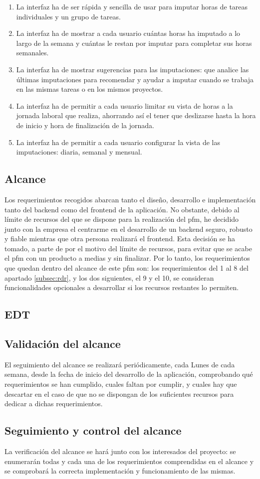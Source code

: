 \begin{enumerate}
 \item La interfaz ha de ser rápida y sencilla de usar para imputar horas de
 tareas individuales y un grupo de tareas.

 \item La interfaz ha de mostrar a cada usuario cuántas horas ha imputado
 a lo largo de la semana y cuántas le restan por imputar para completar sus
 horas semanales.

 \item La interfaz ha de mostrar sugerencias para las imputaciones: que analice
 las últimas imputaciones para recomendar y ayudar a imputar cuando se trabaja
 en las mismas tareas o en los mismos proyectos.

 \item La interfaz ha de permitir a cada usuario limitar su vista de horas a la
 jornada laboral que realiza, ahorrando así el tener que deslizarse hasta la
 hora de inicio y hora de finalización de la jornada.

 \item La interfaz ha de permitir a cada usuario configurar la vista de las
 imputaciones: diaria, semanal y mensual.
\end{enumerate}

\subsection{Alcance}
Los requerimientos recogidos abarcan tanto el diseño, desarrollo e
implementación tanto del \gls{backend} como del \gls{frontend} de la
aplicación. No obstante, debido al límite de recursos del que se dispone
para la realización del \gls{pfm}, he decidido junto con la empresa el
centrarme en el desarrollo de un \gls{backend} seguro, robusto y fiable
mientras que otra persona realizará el \gls{frontend}. Esta decisión se ha
tomado, a parte de por el motivo del límite de recursos, para evitar que
se acabe el \gls{pfm} con un producto a medias y sin finalizar. Por lo tanto,
los requerimientos que quedan dentro del alcance de este \gls{pfm} son: los
requerimientos del 1 al 8 del apartado \ref{subsec:rdr}, y los dos siguientes,
el 9 y el 10, se consideran funcionalidades opcionales a desarrollar si los
recursos restantes lo permiten.

\subsection{EDT}

\subsection{Validación del alcance}
El seguimiento del alcance se realizará periódicamente, cada Lunes de cada
semana, desde la fecha de inicio del desarrollo de la aplicación, comprobando
qué requerimientos se han cumplido, cuales faltan por cumplir, y cuales hay
que descartar en el caso de que no se dispongan de los suficientes recursos
para dedicar a dichas requerimientos.

\subsection{Seguimiento y control del alcance}
La verificación del alcance se hará junto con los interesados del proyecto:
se enumerarán todas y cada una de los requerimientos comprendidas en el alcance
y se comprobará la correcta implementación y funcionamiento de las mismas.

